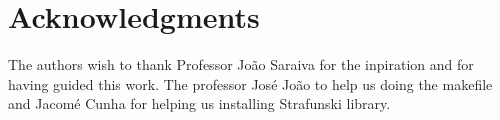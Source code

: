 \section*{Acknowledgments}
The authors wish to thank Professor João Saraiva for the inpiration and for having guided this work.
The professor José João to help us doing the makefile and Jacomé Cunha for helping us installing Strafunski library.

